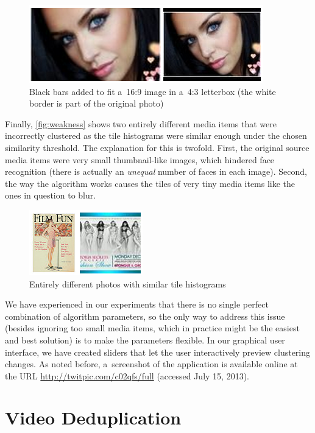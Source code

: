 \begin{figure}[!h]
  \centering
  \includegraphics[width=0.55\linewidth]{./bwtolerance.png}
  \caption[Black bars added to fit a~16:9 image in a~4:3 letterbox]
    {Black bars added to fit a~16:9 image in a~4:3 letterbox
    (the white border is part of the original photo)}
  \label{fig:bwtolerance}
\end{figure}

Finally, \autoref{fig:weakness} shows two entirely different media items
that were incorrectly clustered as the tile histograms
were similar enough under the chosen similarity threshold.
The explanation for this is twofold.
First, the original source media items were very small thumbnail-like images,
which hindered face recognition
(there is actually an \emph{unequal} number of faces in each image).
Second, the way the algorithm works
causes the tiles of very tiny media items like the ones in question to blur.

\begin{figure}[!h]
  \centering
  \includegraphics[width=0.4\linewidth]{./weakness.png}
  \caption{Entirely different photos with similar tile histograms}
  \label{fig:weakness}
\end{figure}

We have experienced in our experiments that there is no single perfect
combination of algorithm parameters,
so the only way to address this issue (besides ignoring too small media items,
which in practice might be the easiest and best solution)
is to make the parameters flexible.
In our graphical user interface, we have created sliders
that let the user interactively preview clustering changes.
As noted before, a~screenshot of the application
is available online at the URL \url{http://twitpic.com/c02qfs/full} (accessed July 15, 2013).

\section{Video Deduplication}


